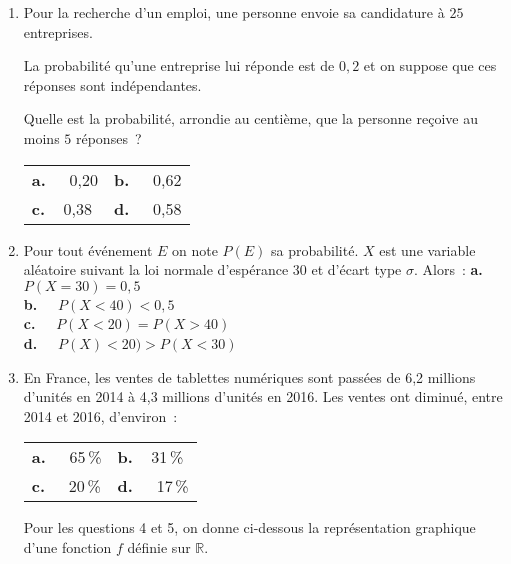 \begin{enumerate}
     \item Pour la recherche d'un emploi, une personne envoie sa candidature à $25$ entreprises.
     \par
     La probabilité qu'une entreprise lui réponde est de $0,2$ et on suppose que ces réponses
     sont indépendantes.
     \par
     Quelle est la probabilité, arrondie au centième, que la personne reçoive au moins $5$
     réponses~?
     \medbreak
     \begin{tabularx}{\linewidth}{*{2}{X}}%
          \textbf{a.~~} 0,20 &\textbf{b.~~} 0,62\\
          \textbf{c.~~}0,38  &\textbf{d.~~} 0,58
     \end{tabularx}
     \medbreak
     \item Pour tout événement $E$ on note $P(E)$ sa probabilité. $X$ est une variable aléatoire suivant la loi normale d'espérance $30$ et d'écart type $\sigma$. Alors~:
     \medbreak
     \textbf{a.~~} $P(X = 30) = 0,5$ \\
     \textbf{b.~~} $P(X < 40 ) < 0,5$\\
     \textbf{c.~~} $P(X < 20) = P(X > 40)$\\
     \textbf{d.~~} $P(X) < 20) > P(X < 30)$\\
     \medbreak
     \item En France, les ventes de tablettes numériques sont passées de 6,2 millions d'unités en 2014 à 4,3 millions d'unités en 2016. Les ventes ont diminué, entre 2014 et 2016,
     d'environ~:
     \medbreak
     \begin{tabularx}{\linewidth}{*{2}{X}}%
          \textbf{a.~~} 65\,\%&\textbf{b.~~}31\,\% \\
          \textbf{c.~~} 20\,\%&\textbf{d.~~}  17\,\%
     \end{tabularx}
     \medbreak
     Pour les questions 4 et 5, on donne ci-dessous
     la représentation graphique d'une
     fonction $f$ définie sur $\mathbb{R}$.
     \medbreak
     \begin{center}
          \begin{extern}%
\end{extern}
\end{center}
\end{enumerate}
